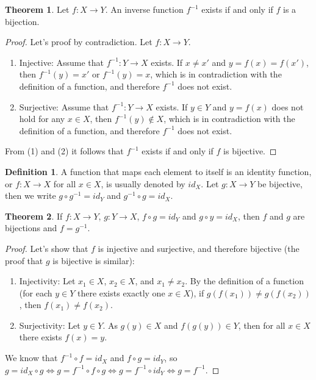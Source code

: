 \documentclass[12pt,a4paper]{article}
\theoremstyle{definition}
\newtheorem{defn}{Definition}[section]
\newtheorem{thm}{Theorem}[section]
\begin{document}
\begin{thm}
Let $f: X \rightarrow Y$. An inverse function $f^{-1}$ exists if and only if
$f$ is a bijection. 
\begin{proof}
Let's proof by contradiction. Let $f: X \rightarrow Y$.

\begin{enumerate}
\item Injective: Assume that $f^{-1}: Y \rightarrow X$ exists. If $x \neq x'$
and $y = f(x) = f(x')$, then $f^{-1}(y) = x'$ or $f^{-1}(y) = x$, which is in
contradiction with the definition of a function, and therefore $f^{-1}$ does
not exist.

\item Surjective: Assume that $f^{-1}: Y \rightarrow X$ exists. If $y \in Y$
and $y = f(x)$ does not hold for any $x \in X$, then $f^{-1}(y) \notin X$,
which is in contradiction with the definition of a function, and therefore
$f^{-1}$ does not exist.
\end{enumerate}
From (1) and (2) it follows that $f^{-1}$ exists if and only if $f$ is
bijective.
\end{proof}
\end{thm}

\begin{defn}
A function that maps each element to itself is an identity function, or $f: X
\rightarrow X$ for all $x \in X$, is usually denoted by $id_X$. Let $g: X
\rightarrow Y$ be bijective, then we write $g \circ g^{-1} = id_Y$ and $g^{-1}
\circ g = id_X$.
\end{defn}

\begin{thm}
If $f: X \rightarrow Y$, $g: Y \rightarrow X$, $f \circ g = id_Y$ and $g \circ
y = id_X$, then $f$ and $g$ are bijections and $f = g^{-1}$.
\begin{proof}
Let's show that $f$ is injective and surjective, and therefore bijective (the
proof that $g$ is bijective is similar):
\begin{enumerate}
\item Injectivity: Let $x_1 \in X$, $x_2 \in X$, and $x_1 \neq x_2$. By the
definition of a function (for each $y \in Y$ there exists exactly one $x \in
X$), if $g(f(x_1)) \neq g(f(x_2))$, then $f(x_1) \neq f(x_2)$.
\item Surjectivity: Let $y \in Y$. As $g(y) \in X$ and $f(g(y)) \in Y$, then
for all $x \in X$ there exists $f(x) = y$.
\end{enumerate}
We know that $f^{-1} \circ f = id_X$ and $f \circ g = id_Y$, so $g = id_X \circ
g \Leftrightarrow g = f^{-1} \circ f \circ g \Leftrightarrow g = f^{-1} \circ
id_Y \Leftrightarrow g = f^{-1}$.
\end{proof}
\end{thm}
\end{document}
